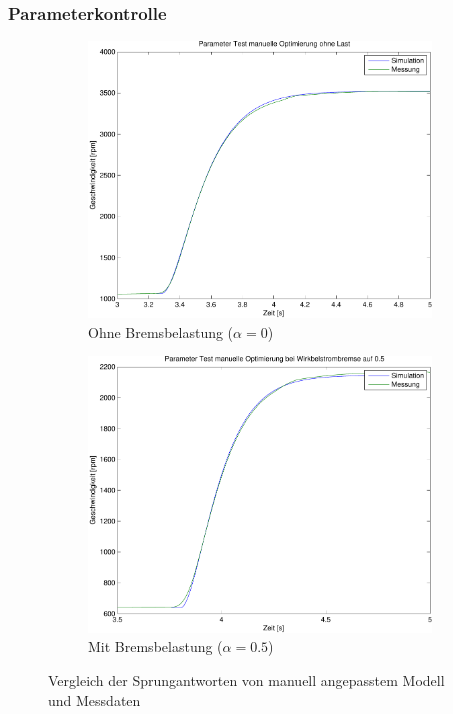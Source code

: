 \subsubsection{Parameterkontrolle}
\begin{figure}[h!]
	\centering
	\begin{subfigure}{0.475\textwidth}
		\includegraphics[width=1\textwidth]{07/parameter_test_noload_man.pdf}
		\caption{Ohne Bremsbelastung ($\alpha = 0$)}
	\end{subfigure}
	\begin{subfigure}{0.475\textwidth}
		\includegraphics[width=1\textwidth]{07/parameter_test_load_man.pdf}
		\caption{Mit Bremsbelastung ($\alpha = 0.5$)}
	\end{subfigure}
	\caption{Vergleich der Sprungantworten von manuell angepasstem Modell und Messdaten}
\end{figure}

